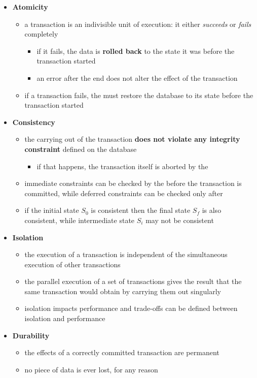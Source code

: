 \documentclass[english]{article}
\begin{document}
\begin{itemize}
  \item \textbf{Atomicity}
        \begin{itemize}
          \item a transaction is an indivisible unit of execution: it either \textit{succeeds} or \textit{fails} completely
                \begin{itemize}
                  \item if it fails, the data is \textbf{rolled back} to the state it was before the transaction started
                  \item an error after the end does not alter the effect of the transaction
                \end{itemize}
          \item if a transaction fails, the \dbms must restore the database to its state before the transaction started
        \end{itemize}
  \item \textbf{Consistency}
        \begin{itemize}
          \item the carrying out of the transaction \textbf{does not violate any integrity constraint} defined on the database
                \begin{itemize}
                  \item if that happens, the transaction itself is aborted by the \dbms
                \end{itemize}
          \item immediate constraints can be checked by the \dbms before the transaction is committed, while deferred constraints can be checked only after
          \item if the initial state \(S_0\) is consistent then the final state \(S_f\) is also consistent, while intermediate state \(S_i\) may not be consistent
        \end{itemize}
  \item \textbf{Isolation}
        \begin{itemize}
          \item the execution of a transaction is independent of the simultaneous execution of other transactions
          \item the parallel execution of a set of transactions gives the result that the same transaction would obtain by carrying them out singularly
          \item isolation impacts performance and trade-offs can be defined between isolation and performance
        \end{itemize}
  \item \textbf{Durability}
        \begin{itemize}
          \item the effects of a correctly committed transaction are permanent
          \item no piece of data is ever lost, for any reason
        \end{itemize}
\end{itemize}
\end{document}

